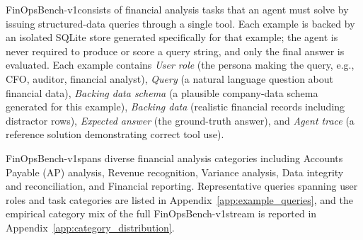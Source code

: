 \documentclass[11pt]{article}
\newcommand{\synthsubset}{FinOpsBench-v1}\xspace
\begin{document}
\synthsubset consists of financial analysis tasks that an agent must solve by issuing structured-data queries through a single tool. Each example is backed by an isolated SQLite store generated specifically for that example; the agent is never required to produce or score a query string, and only the final answer is evaluated. Each example contains \emph{User role} (the persona making the query, e.g., CFO, auditor, financial analyst), \emph{Query} (a natural language question about financial data), \emph{Backing data schema} (a plausible company-data schema generated for this example), \emph{Backing data} (realistic financial records including distractor rows), \emph{Expected answer} (the ground-truth answer), and \emph{Agent trace} (a reference solution demonstrating correct tool use).


\synthsubset spans diverse financial analysis categories including Accounts Payable (AP) analysis, Revenue recognition, Variance analysis, Data integrity and reconciliation, and Financial reporting.
Representative queries spanning user roles and task categories are listed in Appendix~\ref{app:example_queries}, and the empirical category mix of the full \synthsubset stream is reported in Appendix~\ref{app:category_distribution}.
\end{document}
